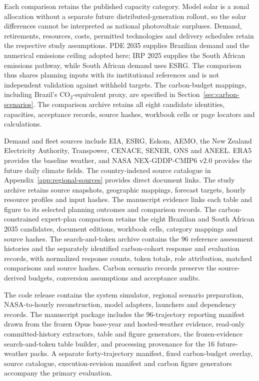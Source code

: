 \documentclass[pdflatex,sn-nature]{sn-jnl}
\begin{document}
Each comparison retains the published capacity category. Model solar is a zonal allocation without a separate future distributed-generation rollout, so the solar differences cannot be interpreted as national photovoltaic surpluses. Demand, retirements, resources, costs, permitted technologies and delivery schedules retain the respective study assumptions. PDE 2035 supplies Brazilian demand and the numerical emissions ceiling adopted here; IRP 2025 supplies the South African emissions pathway, while South African demand uses ESRG. The comparison thus shares planning inputs with its institutional references and is not independent validation against withheld targets. The carbon-budget mappings, including Brazil's CO$_2$-equivalent proxy, are specified in Section~\ref{sec:carbon-scenarios}. The comparison archive retains all eight candidate identities, capacities, acceptance records, source hashes, workbook cells or page locators and calculations.

\backmatter
{}
Demand and fleet sources include EIA, ESRG, Eskom, AEMO, the New Zealand Electricity Authority, Transpower, CENACE, SENER, ONS and ANEEL. ERA5 provides the baseline weather, and NASA NEX-GDDP-CMIP6 v2.0 provides the future daily climate fields\cite{era5,openmeteo,nasa2025nexv2,nasa2022nexcmip6}. The country-indexed source catalogue in Appendix~\ref{app:regional-sources} provides direct document links. The study archive retains source snapshots, geographic mappings, forecast targets, hourly resource profiles and input hashes. The manuscript evidence links each table and figure to its selected planning outcomes and comparison records. The carbon-constrained expert-plan comparison retains the eight Brazilian and South African 2035 candidates, document editions, workbook cells, category mappings and source hashes. The search-and-token archive contains the 96 reference assessment histories and the separately identified carbon-cohort response and evaluation records, with normalized response counts, token totals, role attribution, matched comparisons and source hashes. Carbon scenario records preserve the source-derived budgets, conversion assumptions and acceptance audits.

The code release contains the system simulator, regional scenario preparation, NASA-to-hourly reconstruction, model adapters, launchers and dependency records. The manuscript package includes the 96-trajectory reporting manifest drawn from the frozen Opus base-year and hosted-weather evidence, read-only committed-history extractors, table and figure generators, the frozen-evidence search-and-token table builder, and processing provenance for the 16 future-weather packs. A separate forty-trajectory manifest, fixed carbon-budget overlay, source catalogue, execution-revision manifest and carbon figure generators accompany the primary evaluation.
\end{document}
